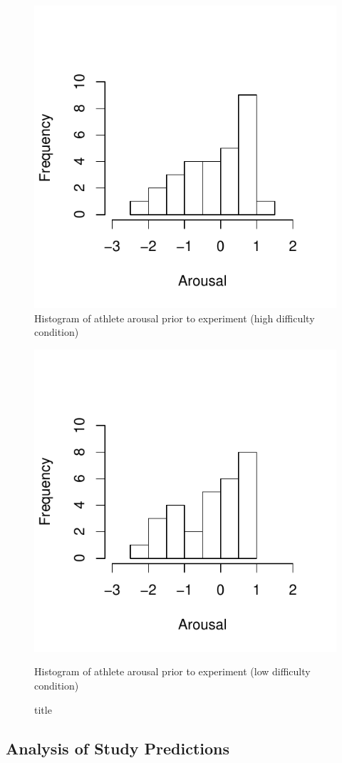 \begin{figure}
  \centering
      \includegraphics[width=0.5\linewidth,keepaspectratio] {images/histArousalFactorPreHigh-1}
      \caption{Histogram of athlete arousal prior to experiment (high difficulty condition)}
        \label{fig:histArousalFactorPreHigh}
    \end{figure}

\begin{figure}
  \centering
  \includegraphics[width=0.5\linewidth,keepaspectratio] {images/histArousalFactorPreLow-1}
      \caption{Histogram of athlete arousal prior to experiment (low difficulty condition)}
  \caption{title}
    \label{fig:histArousalFactorPreLow}
\end{figure}














\subsection{Analysis of Study Predictions\label{app6:analysisStudyPredictions}}





